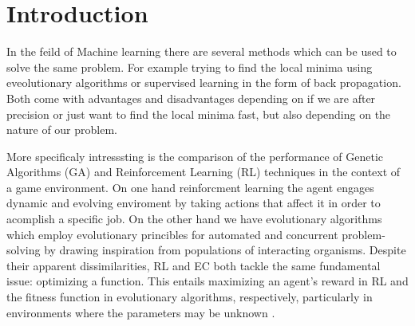 \section{Introduction}



In the feild of Machine learning there are several methods which can be used to solve the same problem. For example trying to find the local minima using eveolutionary algorithms or supervised learning in the form of back propagation. Both come with advantages and disadvantages depending on if we are after precision or just want to find the local minima fast, but also depending on the nature of our problem.

More specificaly intresssting is the comparison of the performance of Genetic Algorithms (GA) and Reinforcement Learning (RL) techniques in the context of a game environment. On one hand reinforcment learning the agent engages dynamic and evolving enviroment by taking actions that affect it in order to acomplish a specific job. On the other hand we have evolutionary algorithms which employ evolutionary princibles for automated and concurrent problem-solving by drawing inspiration from populations of interacting organisms. Despite their apparent dissimilarities, RL and EC both tackle the same fundamental issue: optimizing a function. This entails maximizing an agent's reward in RL and the fitness function in evolutionary algorithms, respectively, particularly in environments where the parameters may be unknown \cite{drugan2019reinforcement}. 





